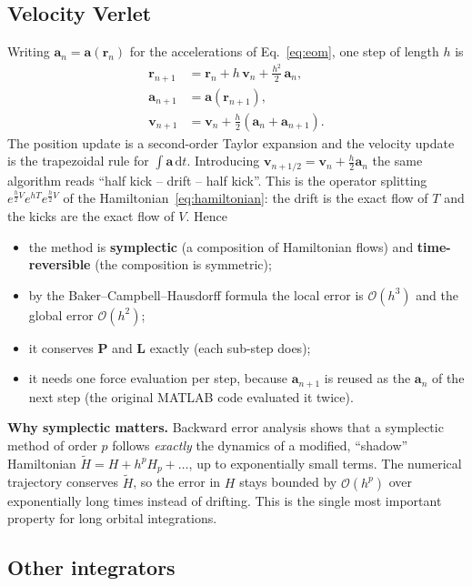 \documentclass[11pt,a4paper]{article}
\newcommand{\vect}[1]{\mathbf{#1}}
\newcommand{\dd}{\mathrm{d}}
\begin{document}
\subsection{Velocity Verlet}\label{sec:verlet}

Writing $\vect a_n=\vect a(\vect r_n)$ for the accelerations of Eq.~\eqref{eq:eom}, one
step of length $h$ is
\begin{align}
  \vect r_{n+1}&=\vect r_n+h\,\vect v_n+\tfrac{h^2}{2}\,\vect a_n, \label{eq:verlet1}\\
  \vect a_{n+1}&=\vect a(\vect r_{n+1}), \\
  \vect v_{n+1}&=\vect v_n+\tfrac{h}{2}\left(\vect a_n+\vect a_{n+1}\right). \label{eq:verlet3}
\end{align}
The position update is a second-order Taylor expansion and the velocity update is the
trapezoidal rule for $\int\vect a\,\dd t$. Introducing $\vect v_{n+1/2}=\vect v_n+\tfrac h2\vect a_n$
the same algorithm reads ``half kick -- drift -- half kick''. This is the operator
splitting $e^{\frac h2 V}e^{hT}e^{\frac h2 V}$ of the Hamiltonian~\eqref{eq:hamiltonian}:
the drift is the exact flow of $T$ and the kicks are the exact flow of $V$. Hence
\begin{itemize}
  \item the method is \textbf{symplectic} (a composition of Hamiltonian flows) and
        \textbf{time-reversible} (the composition is symmetric);
  \item by the Baker--Campbell--Hausdorff formula the local error is $\mathcal O(h^3)$ and
        the global error $\mathcal O(h^2)$;
  \item it conserves $\vect P$ and $\vect L$ exactly (each sub-step does);
  \item it needs one force evaluation per step, because $\vect a_{n+1}$ is reused as the
        $\vect a_n$ of the next step (the original MATLAB code evaluated it twice).
\end{itemize}

\textbf{Why symplectic matters.} Backward error analysis shows that a symplectic method
of order $p$ follows \emph{exactly} the dynamics of a modified, ``shadow'' Hamiltonian
$\tilde H=H+h^pH_p+\dots$, up to exponentially small terms. The numerical trajectory
conserves $\tilde H$, so the error in $H$ stays bounded by $\mathcal O(h^p)$ over
exponentially long times instead of drifting. This is the single most important property
for long orbital integrations.

\subsection{Other integrators}
\end{document}
